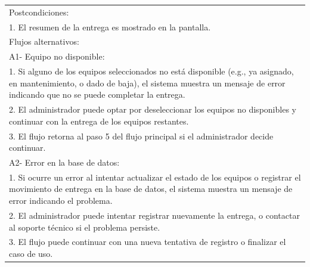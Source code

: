 \documentclass[stu, 12pt, letterpaper, donotrepeattitle, floatsintext, natbib]{apa7}
\begin{document}
\begin{longtable}{@{} p{16.5cm} @{}}
    Postcondiciones:                                                                                                                                                                                                         \\
    1. El resumen de la entrega es mostrado en la pantalla.                                                                                                                                                                  \\ \midrule
    Flujos alternativos:                                                                                                                                                                                                     \\
    A1- Equipo no disponible:                                                                                                                                                                                                \\
    \hspace{1cm}1. Si alguno de los equipos seleccionados no est\'a disponible (e.g., ya asignado, en mantenimiento, o dado de baja), el sistema muestra un mensaje de error indicando que no se puede completar la entrega. \\
    \hspace{1cm}2. El administrador puede optar por deseleccionar los equipos no disponibles y continuar con la entrega de los equipos restantes.                                                                            \\
    \hspace{1cm}3. El flujo retorna al paso 5 del flujo principal si el administrador decide continuar.                                                                                                                      \\
    A2- Error en la base de datos:                                                                                                                                                                                           \\
    \hspace{1cm}1. Si ocurre un error al intentar actualizar el estado de los equipos o registrar el movimiento de entrega en la base de datos, el sistema muestra un mensaje de error indicando el problema.                \\
    \hspace{1cm}2. El administrador puede intentar registrar nuevamente la entrega, o contactar al soporte t\'ecnico si el problema persiste.                                                                                \\
    \hspace{1cm}3. El flujo puede continuar con una nueva tentativa de registro o finalizar el caso de uso.                                                                                                                  \\ \bottomrule
\end{longtable}
\end{document}
